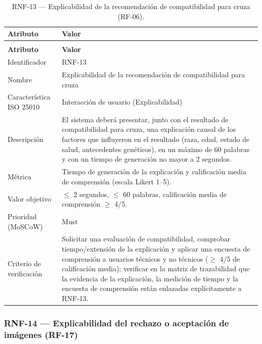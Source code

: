 \documentclass[journal,onecolumn]{IEEEtran}
\makeatletter
\newenvironment{atributos}[2]{%
	\small
	\begin{longtable}{@{}>{\raggedright\arraybackslash}p{4.2cm} >{\raggedright\arraybackslash}p{11.2cm}@{}}
		\caption{#2}\label{tab:#1}\\
		\toprule
		\textbf{Atributo} & \textbf{Valor} \\
		\midrule
		\endfirsthead
		\multicolumn{2}{@{}l}{\small\itshape (continuación)}\\
		\toprule
		\textbf{Atributo} & \textbf{Valor} \\
		\midrule
		\endhead
		\bottomrule
		\endlastfoot
	}{%
	\end{longtable}
	\normalsize
}
\makeatother
\begin{document}
	\begin{atributos}{RNF-13}{RNF-13 --- Explicabilidad de la recomendación de compatibilidad para cruza (RF-06).}
		Identificador & RNF-13 \\
		Nombre & Explicabilidad de la recomendación de compatibilidad para cruza \\
		Característica ISO 25010 & Interacción de usuario (Explicabilidad) \\
		Descripción & El sistema deberá presentar, junto con el resultado de compatibilidad para cruza, una explicación causal de los factores que influyeron en el resultado (raza, edad, estado de salud, antecedentes genéticos), en un máximo de 60 palabras y con un tiempo de generación no mayor a 2 segundos. \\
		Métrica & Tiempo de generación de la explicación y calificación media de comprensión (escala Likert 1--5). \\
		Valor objetivo & $\leq$ 2 segundos, $\leq$ 60 palabras, calificación media de comprensión $\geq$ 4/5. \\
		Prioridad (MoSCoW) & Must \\
		Criterio de verificación & Solicitar una evaluación de compatibilidad, comprobar tiempo/extensión de la explicación y aplicar una encuesta de comprensión a usuarios técnicos y no técnicos ($\geq$ 4/5 de calificación media); verificar en la matriz de trazabilidad que la evidencia de la explicación, la medición de tiempo y la encuesta de comprensión están enlazadas explícitamente a RNF-13. \\
	\end{atributos}
	
	\subsubsection{RNF-14 --- Explicabilidad del rechazo o aceptación de imágenes (RF-17)}
	
\end{document}
